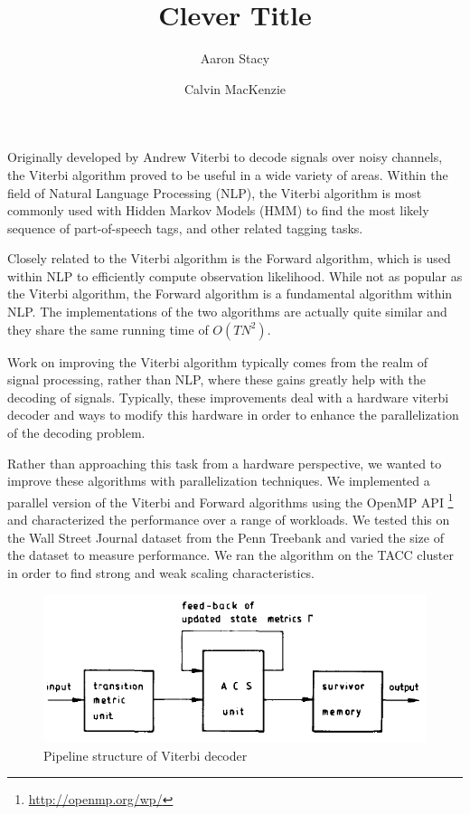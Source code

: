 \documentclass[11pt,onecolumn]{article}
\begin{document}
\title{Clever Title}

\author{
 Aaron Stacy \\ \and
 Calvin MacKenzie \\
}

\maketitle


Originally developed by Andrew Viterbi to decode signals over noisy channels, the Viterbi algorithm proved to be useful in a wide variety of areas. Within the field of Natural Language Processing (NLP), the Viterbi algorithm is most commonly used with Hidden Markov Models (HMM) to find the most likely sequence of part-of-speech tags, and other related tagging tasks.

Closely related to the Viterbi algorithm is the Forward algorithm, which is used within NLP to efficiently compute observation likelihood. While not as popular as the Viterbi algorithm, the Forward algorithm is a fundamental algorithm within NLP. The implementations of the two algorithms are actually quite similar and they share the same running time of $O(T N^2)$.

Work on improving the Viterbi algorithm typically comes from the realm of signal processing, rather than NLP, where these gains greatly help with the decoding of signals. Typically, these improvements deal with a hardware viterbi decoder and ways to modify this hardware in order to enhance the parallelization of the decoding problem.

Rather than approaching this task from a hardware perspective, we wanted to improve these algorithms with parallelization techniques. We implemented a parallel version of the Viterbi and Forward algorithms using the OpenMP API \footnote{\url{http://openmp.org/wp/}} and characterized the performance over a range of workloads. We tested this on the Wall Street Journal dataset from the Penn Treebank and varied the size of the dataset to measure performance. We ran the algorithm on the TACC cluster in order to find strong and weak scaling characteristics.


\begin{figure}[h!]
\centering
\includegraphics[width=.5\linewidth]{figures/pipeline}
\caption{Pipeline structure of Viterbi decoder}
\label{fig:pipeline}
\end{figure}
\end{document}

